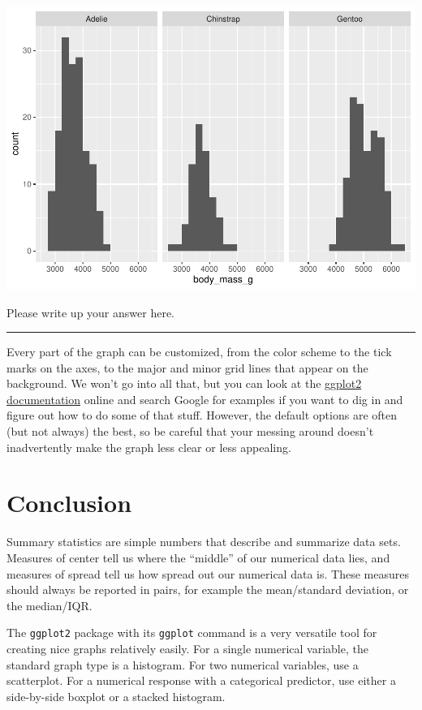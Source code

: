 \documentclass[
]{book}
\begin{document}
\includegraphics{intro_stats_files/figure-latex/unnamed-chunk-118-1.pdf}

Please write up your answer here.

\begin{center}\rule{0.5\linewidth}{0.5pt}\end{center}

Every part of the graph can be customized, from the color scheme to the tick marks on the axes, to the major and minor grid lines that appear on the background. We won't go into all that, but you can look at the \href{http://ggplot2.tidyverse.org/}{ggplot2 documentation} online and search Google for examples if you want to dig in and figure out how to do some of that stuff. However, the default options are often (but not always) the best, so be careful that your messing around doesn't inadvertently make the graph less clear or less appealing.

\hypertarget{numerical-conclusion}{%
\section{Conclusion}\label{numerical-conclusion}}

Summary statistics are simple numbers that describe and summarize data sets. Measures of center tell us where the ``middle'' of our numerical data lies, and measures of spread tell us how spread out our numerical data is. These measures should always be reported in pairs, for example the mean/standard deviation, or the median/IQR.

The \texttt{ggplot2} package with its \texttt{ggplot} command is a very versatile tool for creating nice graphs relatively easily. For a single numerical variable, the standard graph type is a histogram. For two numerical variables, use a scatterplot. For a numerical response with a categorical predictor, use either a side-by-side boxplot or a stacked histogram.
\end{document}
